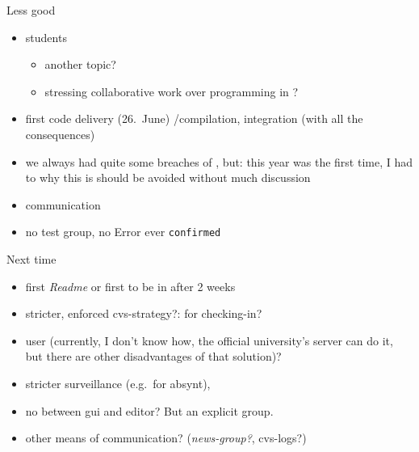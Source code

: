 \begin{myslide}{Less good}
  \begin{itemize}
  \item {} students
    \begin{itemize}
    \item another topic?
    \item stressing collaborative  work over programming in \Java?
    \end{itemize}
  \item {} first code delivery (26.\ June) /compilation,
     integration (with all the consequences)
  \item we always had quite some breaches of , but:
    this year was the first time, I had to  why this is
    should be avoided without much discussion
  \item communication
  \item no test group, no Error ever \texttt{confirmed}
  \end{itemize}
\end{myslide}

\begin{myslide}{Next time}
  \begin{itemize}
  \item first \emph{Readme} or first 
     to be  in after 2 weeks
  \item stricter, enforced cvs-strategy?:  for checking-in?
\item user  (currently, I don't know how, the official
  university's server can do it, but there are other disadvantages of that
  solution)?
  \item stricter surveillance (e.g.\ for absynt), 
  \item no  between gui and editor? But an explicit
     group.
  \item other means of communication? (\emph{news-group?}, cvs-logs?)
  \end{itemize}
\end{myslide}














